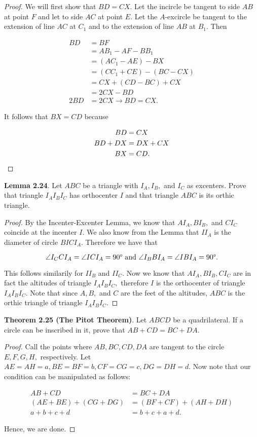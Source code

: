 \documentclass[letterpaper,oneside]{book}
\begin{document}
\begin{proof}  We will first show that $BD=CX$. Let the incircle be tangent to side $AB$ at point $F$ and let to side $AC$ at point $E$. Let the $A$-excircle be tangent to the extension of line $AC$ at $C_1$ and to the extension of line $AB$ at $B_1$. Then

\begin{align*}
BD &= BF \\
&= AB_1 - AF - BB_1 \\
&= (AC_1 - AE) - BX \\
&= (CC_1 + CE) - (BC - CX) \\
&= CX + (CD - BC) + CX \\
&= 2CX - BD \\
2BD&=2CX \rightarrow BD = CX.
\end{align*}

It follows that $BX=CD$ because

\begin{align*}
BD &= CX \\
BD + DX &= DX + CX \\
BX &= CD. \space 
\end{align*}
\end{proof}
  \textbf{Lemma 2.24}.   Let $ABC$ be a triangle with $I_A, I_B,$ and $I_C$ as excenters. Prove that triangle $I_AI_BI_C$ has orthocenter $I$ and that triangle $ABC$ is its orthic triangle.

  \begin{proof}  By the Incenter-Excenter Lemma, we know that $AI_A, BI_B,$ and $CI_C$ coincide at the incenter $I$. We also know from the Lemma that $II_A$ is the diameter of circle $BICI_A.$ Therefore we have that 

$$\angle {I_CCI_A} = \angle {ICI_A} =  90\degree \text{ and } \angle {I_BBI_A} = \angle {IBI_A} = 90\degree .$$

This follows similarily for $II_B$ and $II_C.$ Now we know that $AI_A, BI_B, CI_C$ are in fact the altitudes of triangle $I_AI_BI_C,$ therefore $I$ is the orthocenter of triangle $I_AI_BI_C.$ Note that since $A,B,$ and $C$ are the feet of the altitudes, $ABC$ is the orthic triangle of triangle $I_AI_BI_C.$ \end{proof}

  \textbf{Theorem 2.25 (The Pitot Theorem)}.   Let $ABCD$ be a quadrilateral. If a circle can be inscribed in it, prove that $AB + CD = BC + DA.$

  \begin{proof}  Call the points where $AB, BC, CD, DA$ are tangent to the circle $E, F, G, H,$ respectively. Let $AE = AH = a, BE = BF = b, CF = CG = c, DG = DH = d.$ Now note that our condition can be manipulated as follows:

\begin{align*}
    AB + CD &= BC + DA \\
    (AE + BE) + (CG + DG) &= (BF + CF) + (AH + DH)\\
    a + b + c + d &= b + c + a + d.
\end{align*}

Hence, we are done. \end{proof}
\end{document}
